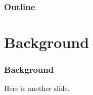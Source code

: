\documentclass{beamer}
\begin{document}
\begin{comment}
* Cases
** Case study: Scientific Computing (we know this target exists)
*** Target user: a senior physics major who knows some C, and wants to either 1) contribute to a project or 2) do some research and feed it back into a community
*** Write wiki articles instead of writing a paper.
*** http://www.scipy.org/Getting_Started
*** http://www.opensourcephysics.org/
**** Extend with projects that run on the EC2 compute cloud / GPGPUs
*** Automation of experiments / Arduino
\end{comment}

\begin{comment}
* existing programmes and opportunities
** GSOC
** Creative Commons uni program
** Wikipedia Prof Program
** TOS (sorta) / POSSE? (maybe)
\end{comment}

\begin{comment}
* Challenges of doing open community stuff with students
** Some problems remaining to solve (for instance, IRC's interface sucks, community members don't always understand the "shoot self in foot" redirection need, hard to find projects, etc)
\end{comment}

\begin{frame} 
\frametitle{Outline}
\end{frame} 

\section{Background}
\begin{frame} 
\frametitle{Background}
Here is another slide. 
\end{frame}
\end{document}
